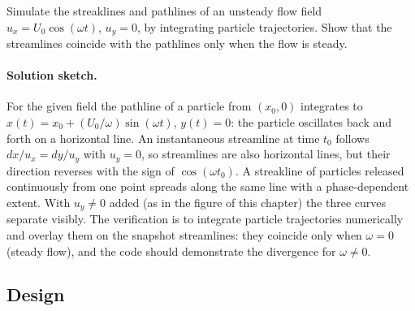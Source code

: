 \begin{exercise}
Simulate the streaklines and pathlines of an unsteady flow field
$u_x = U_0 \cos(\omega t)$, $u_y = 0$, by integrating particle
trajectories. Show that the streamlines coincide with the pathlines
only when the flow is steady.

\paragraph{Solution sketch.} For the given field the pathline of a
particle from $(x_0,0)$ integrates to $x(t) = x_0 + (U_0/\omega)
\sin(\omega t)$, $y(t) = 0$: the particle oscillates back and forth
on a horizontal line. An instantaneous streamline at time $t_0$
follows $dx/u_x = dy/u_y$ with $u_y = 0$, so streamlines are also
horizontal lines, but their direction reverses with the sign of
$\cos(\omega t_0)$. A streakline of particles released continuously
from one point spreads along the same line with a phase-dependent
extent. With $u_y \ne 0$ added (as in the figure of this chapter) the
three curves separate visibly. The verification is to integrate
particle trajectories numerically and overlay them on the snapshot
streamlines: they coincide only when $\omega = 0$ (steady flow), and
the code should demonstrate the divergence for $\omega \ne 0$.
\end{exercise}

\subsection*{Design}

